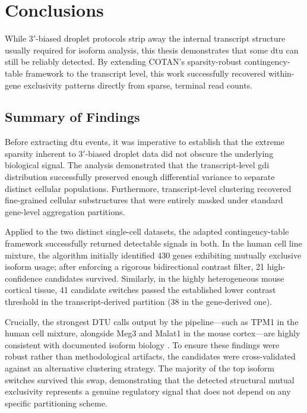 \chapter{Conclusions}

While $3'$-biased droplet protocols strip away the internal transcript structure usually required for isoform analysis, this thesis demonstrates that some \gls{dtu} can still be reliably detected. By extending COTAN's sparsity-robust contingency-table framework to the transcript level, this work successfully recovered within-gene exclusivity patterns directly from sparse, terminal read counts.

\section{Summary of Findings}

Before extracting \gls{dtu} events, it was imperative to establish that the extreme sparsity inherent to $3'$-biased droplet data did not obscure the underlying biological signal. The analysis demonstrated that the transcript-level \gls{gdi} distribution successfully preserved enough differential variance to separate distinct cellular populations. Furthermore, transcript-level clustering recovered fine-grained cellular substructures that were entirely masked under standard gene-level aggregation partitions.

Applied to the two distinct single-cell datasets, the adapted contingency-table framework successfully returned detectable signals in both. In the human cell line mixture, the algorithm initially identified 430 genes exhibiting mutually exclusive isoform usage; after enforcing a rigorous bidirectional contrast filter, 21 high-confidence candidates survived. Similarly, in the highly heterogeneous mouse cortical tissue, 41 candidate switches passed the established lower contrast threshold in the transcript-derived partition (38 in the gene-derived one).

Crucially, the strongest DTU calls output by the pipeline---such as TPM1 in the human cell mixture, alongside Meg3 and Malat1 in the mouse cortex---are highly consistent with documented isoform biology \cite{ghanam2023malat1, xue2012specialized}. To ensure these findings were robust rather than methodological artifacts, the candidates were cross-validated against an alternative clustering strategy. The majority of the top isoform switches survived this swap, demonstrating that the detected structural mutual exclusivity represents a genuine regulatory signal that does not depend on any specific partitioning scheme.

